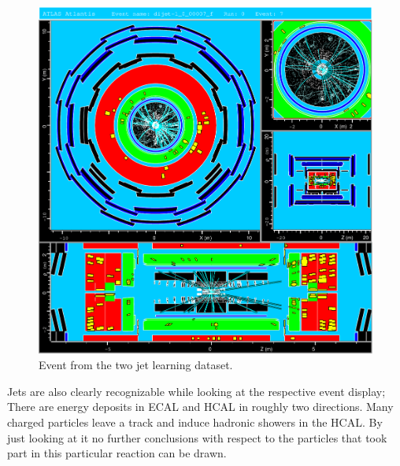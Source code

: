 \documentclass[11pt,a4paper,notitlepage]{scrartcl}
\begin{document}
\begin{figure}[H]
	\centering
	\includegraphics[width=.8\linewidth]{atlantis/dijet_testing}
	\caption{Event from the two jet learning dataset.}
\end{figure} 
Jets are also clearly recognizable while looking at the respective event display; There are energy deposits in ECAL and HCAL in roughly two directions. Many charged particles leave a track and induce hadronic showers in the HCAL. By just looking at it no further conclusions with respect to the particles that took part in this particular reaction can be drawn.
\end{document}
